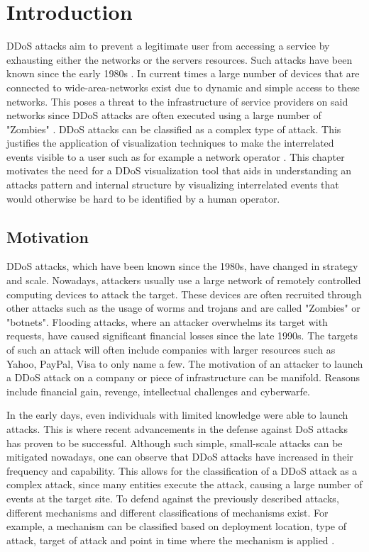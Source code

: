 \chapter{Introduction}
DDoS attacks aim to prevent a legitimate user from accessing a service by exhausting either the networks or the servers resources. Such attacks have been known since the early 1980s \cite{zargar}. In current times a large number of devices that are connected to wide-area-networks exist due to dynamic and simple access to these networks. This poses a threat to the infrastructure of service providers on said networks since DDoS attacks are often executed using a large number of "Zombies" \cite{zargar} \cite{kamboj}. DDoS attacks can be classified as a complex type of attack. This justifies the application of visualization techniques to make the interrelated events visible to a user such as for example a network operator \cite{yelizarov}.  This chapter motivates the need for a DDoS visualization tool that aids in understanding an attacks pattern and internal structure by visualizing interrelated events that would otherwise be hard to be identified by a human operator.

\section{Motivation}
DDoS attacks, which have been known since the 1980s, have changed in strategy and scale. Nowadays, attackers usually use a large network of remotely controlled computing devices to attack the target. These devices are often recruited through other attacks such as the usage of worms and trojans and are called "Zombies" or "botnets".
Flooding attacks, where an attacker overwhelms its target with requests, have caused significant financial losses since the late 1990s. The targets of such an attack will often include companies with larger resources such as Yahoo, PayPal, Visa to only name a few. The motivation of an attacker to launch a DDoS attack on a company or piece of infrastructure can be manifold. Reasons include financial gain, revenge, intellectual challenges and cyberwarfe.

In the early days, even individuals with limited knowledge were able to launch attacks. This is where recent advancements in the defense against DoS attacks has proven to be successful. Although such simple, small-scale attacks can be mitigated nowadays, one can observe that DDoS attacks have increased in their frequency and capability\cite{zargar}.
This allows for the classification of a DDoS attack as a complex attack, since many entities execute the attack, causing a large number of events at the target site\cite{yelizarov}.
To defend against the previously described attacks, different mechanisms and different classifications of mechanisms exist. For example, a mechanism can be classified based on deployment location, type of attack, target of attack and point in time where the mechanism is applied \cite{zargar}.

